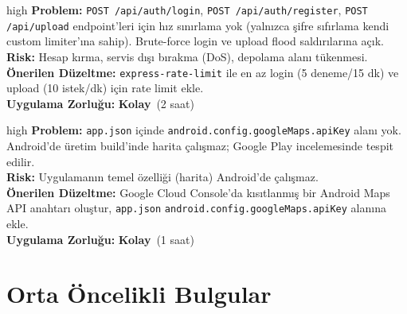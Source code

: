 \documentclass[12pt,a4paper]{article}
\newcommand{\EASY}{\textcolor{low}{\textbf{Kolay}}}
\begin{document}
\begin{auditbox}{high}
\textbf{Problem:} \texttt{POST /api/auth/login}, \texttt{POST /api/auth/register}, \texttt{POST /api/upload} endpoint'leri için hız sınırlama yok (yalnızca şifre sıfırlama kendi custom limiter'ına sahip). Brute-force login ve upload flood saldırılarına açık.\\[0.3em]
\textbf{Risk:} Hesap kırma, servis dışı bırakma (DoS), depolama alanı tükenmesi.\\[0.3em]
\textbf{Önerilen Düzeltme:} \texttt{express-rate-limit} ile en az login (5 deneme/15 dk) ve upload (10 istek/dk) için rate limit ekle.\\[0.3em]
\textbf{Uygulama Zorluğu:} \EASY\ (2 saat)
\end{auditbox}

\begin{auditbox}{high}
\textbf{Problem:} \texttt{app.json} içinde \texttt{android.config.googleMaps.apiKey} alanı yok. Android'de üretim build'inde harita çalışmaz; Google Play incelemesinde tespit edilir.\\[0.3em]
\textbf{Risk:} Uygulamanın temel özelliği (harita) Android'de çalışmaz.\\[0.3em]
\textbf{Önerilen Düzeltme:} Google Cloud Console'da kısıtlanmış bir Android Maps API anahtarı oluştur, \texttt{app.json} \texttt{android.config.googleMaps.apiKey} alanına ekle.\\[0.3em]
\textbf{Uygulama Zorluğu:} \EASY\ (1 saat)
\end{auditbox}

\section{Orta Öncelikli Bulgular}
\end{document}

